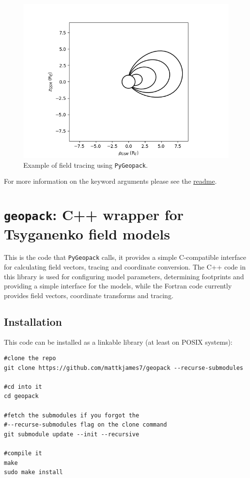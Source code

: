 			\begin{figure}
				\centering\includegraphics[width=\textwidth]{figures/ch03_geopacktrace.png}
				\caption{Example of field tracing using \texttt{PyGeopack}.
					\label{figGeopackTrace}}
			\end{figure}

			For more information on the keyword arguments please see the \href{https://github.com/mattkjames7/PyGeopack/blob/master/README.md}{readme}.

	\section{\texttt{geopack}: C++ wrapper for Tsyganenko field models}

		\label{sectGeopack}

		This is the code that \texttt{PyGeopack} calls, it provides a simple C-compatible interface for calculating field vectors, tracing and coordinate conversion. The C++ code in this library is used for configuring model parameters, determining footprints and providing a simple interface for the models, while the Fortran code currently provides field vectors, coordinate transforms and tracing.

		\subsection{Installation}

			This code can be installed as a linkable library (at least on POSIX systems):
			\begin{verbatim}
#clone the repo
git clone https://github.com/mattkjames7/geopack --recurse-submodules

#cd into it
cd geopack

#fetch the submodules if you forgot the 
#--recurse-submodules flag on the clone command
git submodule update --init --recursive

#compile it
make
sudo make install
			\end{verbatim}

